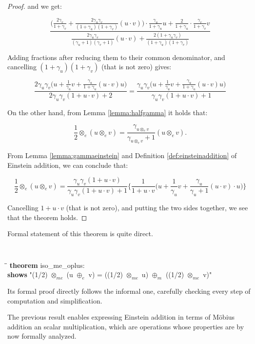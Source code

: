 \documentclass[a4paper]{article}
\newcommand{\tab}{\hspace{5mm}}
\theoremstyle{definition}
\begin{document}
\begin{proof}
and we get:

$$\frac
{\Big( \frac{2\gamma_v}{1+\gamma_v}+\frac{2\gamma_u\gamma_v}{(1+\gamma_u)(1+\gamma_v)}(u\cdot v)\Big)\cdot\frac{\gamma_u}{1+\gamma_u}u + \frac{2}{1+\gamma_u}\cdot\frac{\gamma_v}{1+\gamma_v}v}
{\frac{2\gamma_u\gamma_v}{(\gamma_u+1)(\gamma_v+1)}(u\cdot v) + \frac{2(1+\gamma_u\gamma_v)}{(1+\gamma_u)(1+\gamma_v)}}
$$

Adding fractions after reducing them to their common denominator, and
cancelling $(1+\gamma_u)(1+\gamma_v)$ (that is not zero) gives:

$$
\frac{2\gamma_u\gamma_v\Big(u+\frac{1}{\gamma_u}v+\frac{\gamma_u}{1+\gamma_u}(u \cdot v)u\Big)}{2\gamma_u\gamma_v(1+u\cdot v) + 2} = \frac{\gamma_u\gamma_v\Big(u+\frac{1}{\gamma_u}v+\frac{\gamma_u}{1+\gamma_u}(u \cdot v)u\Big)}{\gamma_u\gamma_v(1+u\cdot v) + 1}
$$

On the other hand, from Lemma \ref{lemma:halfgamma} it holds that:

$$\frac{1}{2}\otimes_e (u \otimes_e v) = \frac{\gamma_{u \otimes_e
    v}}{\gamma_{u \otimes_e v} + 1}(u \otimes_e v).$$

From Lemma \ref{lemma:gammaeinstein} and Definition
\ref{def:einsteinaddition} of Einstein addition, we can conclude that:

$$\frac{1}{2}\otimes_e (u \otimes_e v) = \frac{\gamma_u \gamma_v (1+u\cdot v)}{\gamma_u \gamma_v (1+u\cdot v) + 1}\Big\{\frac{1}{1+u\cdot v}\Big( u +\frac{1}{\gamma_u}v + \frac{\gamma_u}{\gamma_u + 1}(u\cdot v)\cdot u \Big)\Big\}$$

Cancelling $1 + u\cdot v$ (that is not zero), and putting the two
sides together, we see that the theorem holds.
\end{proof}

Formal statement of this theorem is quite direct.

{\tt
\begin{small}
\begin{tabbing}
\tab\=\tab\=\kill
{\bf theorem} iso\_me\_oplus:\\
\>  {\bf shows} "(1/2) $\otimes_{me}$ (u $\oplus_e$ v) = ((1/2) $\otimes_{me}$ u) $\oplus_m$ ((1/2) $\otimes_{me}$ v)"
\end{tabbing}
\end{small}
}

\noindent Its formal proof directly follows the informal one,
carefully checking every step of computation and simplification.

The previous result enables expressing Einstein addition in terms of
M\"obius addition an scalar multiplication, which are operations whose
properties are by now formally analyzed.
\end{document}
